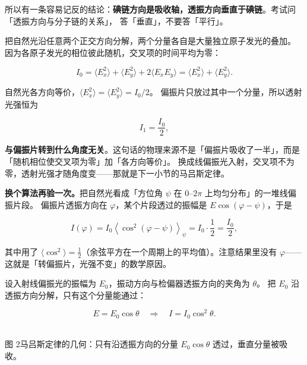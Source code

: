 \documentclass[11pt]{ctexart}
\let\subhdrtheme\subhdr
\renewcommand{\subhdr}[1]{\needspace{4\baselineskip}\subhdrtheme{#1}}
\begin{document}
所以有一条容易记反的结论：\textbf{碘链方向是吸收轴，透振方向垂直于碘链}。考试问「透振方向与分子链的关系」，
答「垂直」，不要答「平行」。


把自然光沿任意两个正交方向分解，两个分量各自是大量独立原子发光的叠加。
因为各原子发光的相位彼此随机，交叉项的时间平均为零：

\[
I_0=\langle E_x^2\rangle+\langle E_y^2\rangle+2\langle E_xE_y\rangle
=\langle E_x^2\rangle+\langle E_y^2\rangle .
\]

自然光各方向等价，$\langle E_x^2\rangle=\langle E_y^2\rangle=I_0/2$。
偏振片只放过其中一个分量，所以透射光强恒为

\[
I_1=\frac{I_0}{2},
\]

\textbf{与偏振片转到什么角度无关}。这句话的物理来源不是「偏振片吸收了一半」，而是「随机相位使交叉项为零」加「各方向等价」。
换成线偏振光入射，交叉项不为零，透射光强才随角度变——那就是下一小节的马吕斯定律。

\textbf{换个算法再验一次。}把自然光看成「方位角 $\psi$ 在 $0$--$2\pi$ 上均匀分布」的一堆线偏振片段。
偏振片透振方向在 $\varphi$，某个片段透过的振幅是 $E\cos(\varphi-\psi)$，于是

\[
I(\varphi)=I_0\left\langle\cos^2(\varphi-\psi)\right\rangle_\psi
=I_0\cdot\frac{1}{2}=\frac{I_0}{2},
\]

其中用了 $\langle\cos^2\rangle=\tfrac12$（余弦平方在一个周期上的平均值）。注意结果里没有 $\varphi$——
这就是「转偏振片，光强不变」的数学原因。


设入射线偏振光的振幅为 $E_0$，振动方向与检偏器透振方向的夹角为 $\theta$。
把 $E_0$ 沿透振方向分解，只有这个分量能通过：

\[
E=E_0\cos\theta
\quad\Longrightarrow\quad
I=I_0\cos^2\theta .
\]

\begin{center}
\\[2pt]
{\small\color{inkgray} 图 2\quad 马吕斯定律的几何：只有沿透振方向的分量 $E_0\cos\theta$ 透过，垂直分量被吸收。}
\end{center}
\end{document}

